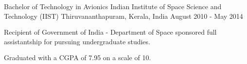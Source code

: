 \begin{cventries}
  \cventry
    {Bachelor of Technology in Avionics}
    {Indian Institute of Space Science and Technology (IIST)}
    {Thiruvananthapuram, Kerala, India}
    {August 2010 - May 2014}
    {
      \begin{cvitems}
        \item Recipient of Government of India - Department of 	Space sponsored full assistantship for pursuing undergraduate studies.
	\item Graduated with a CGPA of 7.95 on a scale of 10.
      \end{cvitems}
    }
\end{cventries}
